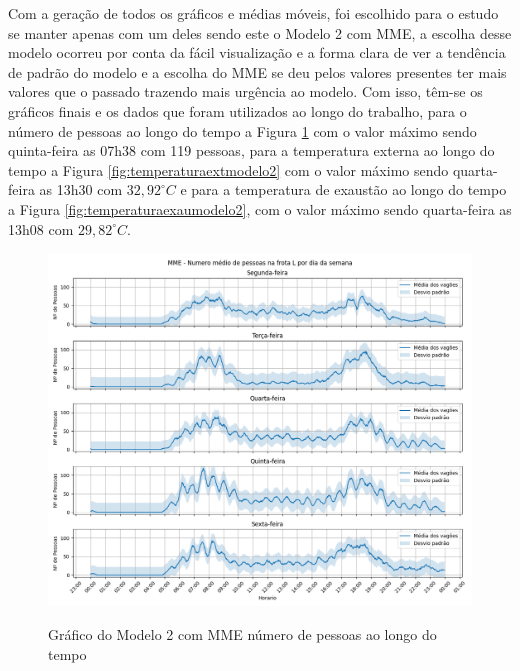 \documentclass[acronym,symbols,table]{fei}
\begin{document}
\newpage 

Com a geração de todos os gráficos e médias móveis, foi escolhido para o estudo se manter apenas com um deles sendo este o Modelo 2 com MME, a escolha desse modelo ocorreu por conta da fácil visualização e a forma clara de ver a tendência de padrão do modelo e a escolha do MME se deu pelos valores presentes ter mais valores que o passado trazendo mais urgência ao modelo. Com isso, têm-se os gráficos finais e os dados que foram utilizados ao longo do trabalho, para o número de pessoas ao longo do tempo a Figura \ref{fig:numeromodelo2} com o valor máximo sendo quinta-feira as 07h38 com 119 pessoas, para a temperatura externa ao longo do tempo a Figura \ref{fig:temperaturaextmodelo2} com o valor máximo sendo quarta-feira as 13h30 com $32,92 ^\circ C$ e para a temperatura de exaustão ao longo do tempo a Figura \ref{fig:temperaturaexaumodelo2}, com o valor máximo sendo quarta-feira as 13h08 com $29,82 ^\circ C$.

\begin{figure}[!htb]
	    \centering
	    \caption{Gráfico do Modelo 2 com MME número de pessoas ao longo do tempo}
        \includegraphics[width=0.7\linewidth]{Imagens/MME_-_Numero_medio_de_pessoas_na_frota_L_por_dia_da_semana_desvio_padrao.png}
        \label{fig:numeromodelo2}
\end{figure}
\end{document}
